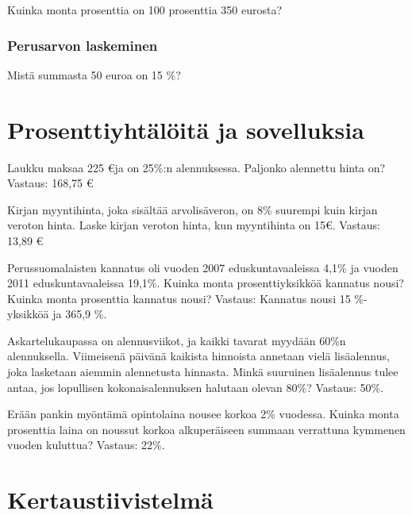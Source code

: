 Kuinka monta prosenttia on 100 prosenttia 350 eurosta?

\subsection{Perusarvon laskeminen}

Mistä summasta 50 euroa on 15 $\%$?

\chapter{Prosenttiyhtälöitä ja sovelluksia}

Laukku maksaa 225 \euro ja on 25\%:n alennuksessa. Paljonko alennettu hinta on?
Vastaus: 168,75 \euro

Kirjan myyntihinta, joka sisältää arvolisäveron, on 8\% suurempi kuin kirjan veroton hinta. Laske kirjan veroton hinta, kun myyntihinta on 15\euro.
Vastaus: 13,89 \euro

Perussuomalaisten kannatus oli vuoden 2007 eduskuntavaaleissa 4,1\% ja vuoden 2011 eduskuntavaaleissa 19,1\%. Kuinka monta prosenttiyksikköä kannatus nousi? Kuinka monta prosenttia kannatus nousi?
Vastaus: Kannatus nousi 15 \%-yksikköä ja 365,9 \%.

Askartelukaupassa on alennusviikot, ja kaikki tavarat myydään 60\%n alennuksella. Viimeisenä päivänä kaikista hinnoista annetaan vielä lisäalennus, joka lasketaan aiemmin alennetusta hinnasta. Minkä suuruinen lisäalennus tulee antaa, jos lopullisen kokonaisalennuksen halutaan olevan 80\%?
Vastaus: 50\%.

Erään pankin myöntämä opintolaina nousee korkoa 2\% vuodessa. Kuinka monta prosenttia laina on noussut korkoa alkuperäiseen summaan verrattuna kymmenen vuoden kuluttua?
Vastaus: 22\%.

%
%
\chapter{Kertaustiivistelmä}
